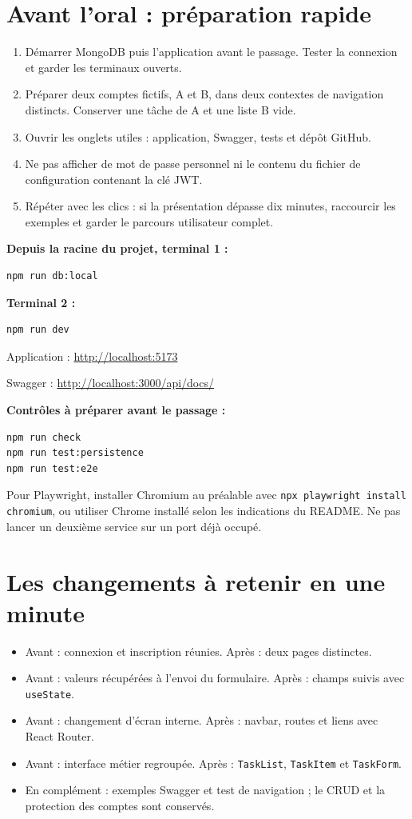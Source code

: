 \documentclass[11pt,a4paper]{article}
\begin{document}
\section*{Avant l'oral : préparation rapide}
\begin{enumerate}
\item Démarrer MongoDB puis l'application avant le passage. Tester la connexion et garder les terminaux ouverts.
\item Préparer deux comptes fictifs, A et B, dans deux contextes de navigation distincts. Conserver une tâche de A et une liste B vide.
\item Ouvrir les onglets utiles : application, Swagger, tests et dépôt GitHub.
\item Ne pas afficher de mot de passe personnel ni le contenu du fichier de configuration contenant la clé JWT.
\item Répéter avec les clics : si la présentation dépasse dix minutes, raccourcir les exemples et garder le parcours utilisateur complet.
\end{enumerate}

\textbf{Depuis la racine du projet, terminal 1 :}
\begin{verbatim}
npm run db:local
\end{verbatim}
\textbf{Terminal 2 :}
\begin{verbatim}
npm run dev
\end{verbatim}
Application : \url{http://localhost:5173}\par
Swagger : \url{http://localhost:3000/api/docs/}

\textbf{Contrôles à préparer avant le passage :}
\begin{verbatim}
npm run check
npm run test:persistence
npm run test:e2e
\end{verbatim}
Pour Playwright, installer Chromium au préalable avec \texttt{npx playwright install chromium}, ou utiliser Chrome installé selon les indications du README. Ne pas lancer un deuxième service sur un port déjà occupé.

\section*{Les changements à retenir en une minute}
\begin{itemize}
\item Avant : connexion et inscription réunies. Après : deux pages distinctes.
\item Avant : valeurs récupérées à l'envoi du formulaire. Après : champs suivis avec \texttt{useState}.
\item Avant : changement d'écran interne. Après : navbar, routes et liens avec React Router.
\item Avant : interface métier regroupée. Après : \texttt{TaskList}, \texttt{TaskItem} et \texttt{TaskForm}.
\item En complément : exemples Swagger et test de navigation ; le CRUD et la protection des comptes sont conservés.
\end{itemize}
\end{document}
